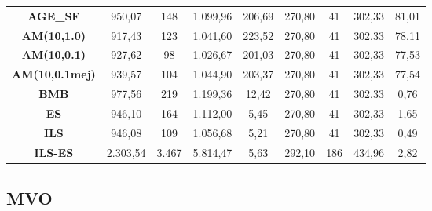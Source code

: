 \begin{table}[H]
{\begin{tabular}{ccccccccc}
\multicolumn{1}{|c|}{\textbf{AGE\_SF}} & 950,07 & 148 & 1.099,96 & \multicolumn{1}{c|}{206,69} & 270,80 & 41 & 302,33 & \multicolumn{1}{c|}{81,01} \\
\multicolumn{1}{|c|}{\textbf{AM(10,1.0)}} & 917,43 & 123 & 1.041,60 & \multicolumn{1}{c|}{223,52} & 270,80 & 41 & 302,33 & \multicolumn{1}{c|}{78,11} \\
\multicolumn{1}{|c|}{\textbf{AM(10,0.1)}} & 927,62 & 98 & 1.026,67 & \multicolumn{1}{c|}{201,03} & 270,80 & 41 & 302,33 & \multicolumn{1}{c|}{77,53} \\
\multicolumn{1}{|c|}{\textbf{AM(10,0.1mej)}} & 939,57 & 104 & 1.044,90 & \multicolumn{1}{c|}{203,37} & 270,80 & 41 & 302,33 & \multicolumn{1}{c|}{77,54} \\
\multicolumn{1}{|c|}{\textbf{BMB}} & 977,56 & 219 & 1.199,36 & \multicolumn{1}{c|}{12,42} & 270,80 & 41 & 302,33 & \multicolumn{1}{c|}{0,76} \\
\multicolumn{1}{|c|}{\textbf{ES}} & 946,10 & 164 & 1.112,00 & \multicolumn{1}{c|}{5,45} & 270,80 & 41 & 302,33 & \multicolumn{1}{c|}{1,65} \\
\multicolumn{1}{|c|}{\textbf{ILS}} & 946,08 & 109 & 1.056,68 & \multicolumn{1}{c|}{5,21} & 270,80 & 41 & 302,33 & \multicolumn{1}{c|}{0,49} \\
\multicolumn{1}{|c|}{\textbf{ILS-ES}} & 2.303,54 & 3.467 & 5.814,47 & \multicolumn{1}{c|}{5,63} & 292,10 & 186 & 434,96 & \multicolumn{1}{c|}{2,82} \\ \hline
\end{tabular}%
}
\end{table}

\newpage

\subsection{MVO}
